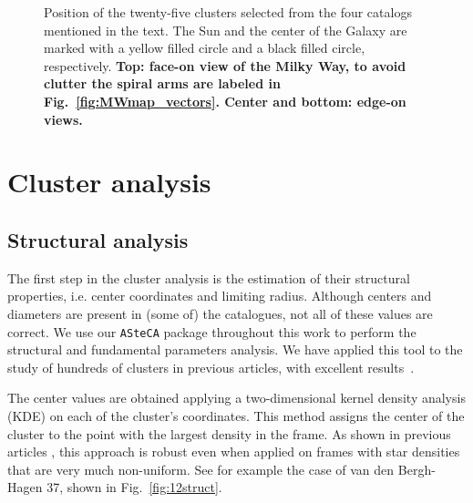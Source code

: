 \documentclass[referee]{aa}
\begin{document}
 \begin{figure}
  \caption{Position of the twenty-five clusters selected from the four
  catalogs mentioned in the text. The Sun and the center of the Galaxy are
  marked with a yellow filled circle and a black filled circle, respectively. 
  \textbf{Top: face-on view of the Milky Way, to avoid clutter the spiral arms
  are labeled in Fig.~\ref{fig:MWmap_vectors}. Center and bottom: edge-on
  views.}}
  \label{fig:MWmap}
 \end{figure}





\section{Cluster analysis}
 \label{sec:clust_analy}

 \subsection{Structural analysis}

  The first step in the cluster analysis is the estimation of their structural
  properties, i.e. center coordinates and limiting radius. Although centers and
  diameters are present in (some of) the catalogues, not all of these values are
  correct. We use our \texttt{ASteCA} package throughout this
  work to perform the structural and fundamental parameters analysis. We have
  applied this tool to the study of hundreds of clusters in previous articles,
  with excellent results~\citep{Perren_2017,Perren_2020}.

  The center values are obtained applying a two-dimensional kernel density
  analysis (KDE) on each of the cluster's coordinates. This method assigns the
  center of the cluster to the point with the largest density in the frame. As
  shown in previous articles \citep{Perren_2015,Perren_2017,Perren_2020}, this
  approach is robust even when applied on frames with star densities that
  are very much non-uniform. See for example the case of van den Bergh-Hagen 37,
  shown in Fig.~\ref{fig:12struct}.
\end{document}
